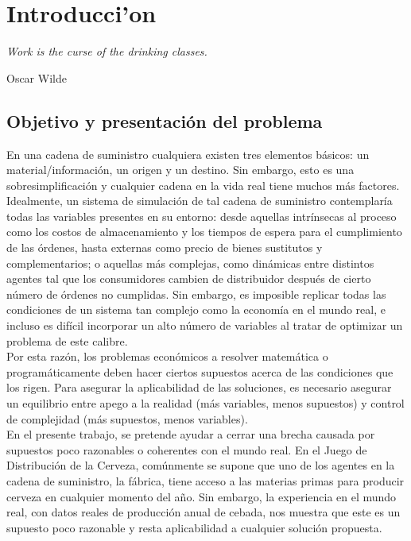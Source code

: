 \chapter{Introducci'on}

\textit{Work is the curse of the drinking classes.}
\begin{flushright}
 Oscar Wilde
 \end{flushright}

\vspace{10 pt}

\section{Objetivo y presentaci\'on del problema}

En una cadena de suministro cualquiera existen tres elementos b\'asicos: un material/informaci\'on, un origen y un destino. Sin embargo, esto es una sobresimplificaci\'on y cualquier cadena en la vida real tiene muchos m\'as factores.\\

Idealmente, un sistema de simulaci\'on de tal cadena de suministro contemplar\'ia todas las variables presentes en su entorno: desde aquellas intr\'insecas al proceso como los costos de almacenamiento y los tiempos de espera para el cumplimiento de las \'ordenes, hasta externas como precio de bienes sustitutos y complementarios; o aquellas m\'as complejas, como din\'amicas entre distintos agentes tal que los consumidores cambien de distribuidor despu\'es de cierto n\'umero de \'ordenes no cumplidas. Sin embargo, es imposible replicar todas las condiciones de un sistema tan complejo como la econom\'ia en el mundo real, e incluso es dif\'icil incorporar un alto n\'umero de variables al tratar de optimizar un problema de este calibre.\\

Por esta raz\'on, los problemas econ\'omicos a resolver matem\'atica o program\'aticamente deben hacer ciertos supuestos acerca de las condiciones que los rigen. Para asegurar la aplicabilidad de las soluciones, es necesario asegurar un equilibrio entre apego a la realidad (m\'as variables, menos supuestos) y control de complejidad (m\'as supuestos, menos variables).\\

En el presente trabajo, se pretende ayudar a cerrar una brecha causada por supuestos poco razonables o coherentes con el mundo real. En el Juego de Distribuci\'on de la Cerveza, com\'unmente se supone que uno de los agentes en la cadena de suministro, la f\'abrica, tiene acceso a las materias primas para producir cerveza en cualquier momento del a\~no. Sin embargo, la experiencia en el mundo real, con datos reales de producci\'on anual de cebada, nos muestra que este es un supuesto poco razonable y resta aplicabilidad a cualquier soluci\'on propuesta.\\

